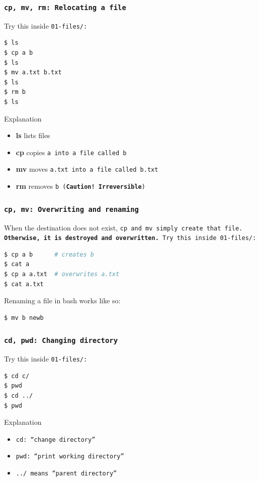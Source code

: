 \begin{frame}[fragile]
\frametitle{\tt{cp, mv, rm}: Relocating a file}
Try this inside \tt{01-files/}:
\begin{lstlisting}[language=bash]
$ ls
$ cp a b
$ ls
$ mv a.txt b.txt
$ ls
$ rm b
$ ls
\end{lstlisting}
\begin{block}{Explanation}
    \begin{itemize}
        \item \textbf{ls} lists files
        \item \textbf{cp} copies \tt{a} into a file called \tt{b}
        \item \textbf{mv} moves \tt{a.txt} into a file called \tt{b.txt}
        \item \textbf{rm} removes \tt{b} (\textbf{Caution! Irreversible})
    \end{itemize}
\end{block}
\end{frame}

\begin{frame}[fragile]
\frametitle{\tt{cp, mv}: Overwriting and renaming}
When the destination does not exist, \tt{cp} and \tt{mv} simply create
that file. \textbf{Otherwise, it is destroyed and overwritten.}
\newline
Try this inside \tt{01-files/}:
\begin{lstlisting}[language=bash]
$ cp a b      # creates b
$ cat a
$ cp a a.txt  # overwrites a.txt
$ cat a.txt
\end{lstlisting}

Renaming a file in bash works like so:
\begin{lstlisting}[language=bash]
$ mv b newb
\end{lstlisting}
\end{frame}


\begin{frame}[fragile]
\frametitle{\tt{cd, pwd}: Changing directory}
Try this inside \tt{01-files/}:
\begin{lstlisting}[language=bash]
$ cd c/
$ pwd
$ cd ../
$ pwd
\end{lstlisting}
\begin{block}{Explanation}
    \begin{itemize}
        \item \tt{cd}: ``change directory''
        \item \tt{pwd}: ``print working directory''
        \item \tt{../} means ``parent directory''
    \end{itemize}
\end{block}
\end{frame}

